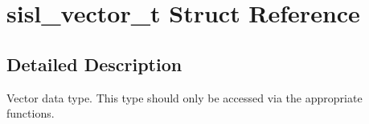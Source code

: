 \hypertarget{structsisl__vector__t}{
\section{sisl\_\-vector\_\-t Struct Reference}
\label{structsisl__vector__t}
}


\subsection{Detailed Description}
Vector data type. This type should only be accessed via the appropriate functions. 

